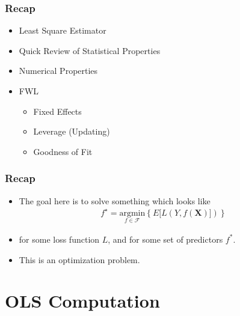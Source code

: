 \documentclass[
  shownotes,
  xcolor={svgnames},
  hyperref={colorlinks,citecolor=DarkBlue,linkcolor=DarkRed,urlcolor=DarkBlue}
  , aspectratio=169]{beamer}
\begin{document}
\begin{frame}
\frametitle{Recap}


  \begin{itemize} 
    \item Least Square Estimator
    \medskip
    \item Quick Review of Statistical Properties
    \medskip
    \item Numerical Properties
    \medskip
    \item FWL
    \begin{itemize}
    \item Fixed Effects
    \item Leverage (Updating)
    \item Goodness of Fit
  \end{itemize}
  \end{itemize}
  
\end{frame}
\begin{frame}[fragile]
\frametitle{Recap}

\begin{itemize}

      \item The goal here is to solve something which looks like
    \begin{align}
    f^\star=\underset{f\in\mathcal{F}}{\text{argmin}}\left\lbrace E [L(Y,f(\mathbf{X})]) \right\rbrace
    \end{align}
\medskip
\item for some loss function $L$, and for some set of predictors $f^*$. 
\medskip
\item This is an optimization problem. 

\end{itemize}


\end{frame}


\section{OLS Computation}
\end{document}
